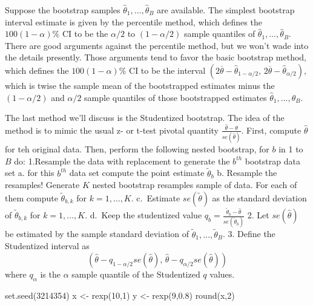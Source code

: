 \documentclass[
]{book}
\newenvironment{Shaded}{\begin{snugshade}}{\end{snugshade}}
\newcommand{\DecValTok}[1]{\textcolor[rgb]{0.00,0.00,0.81}{#1}}
\newcommand{\FloatTok}[1]{\textcolor[rgb]{0.00,0.00,0.81}{#1}}
\newcommand{\FunctionTok}[1]{\textcolor[rgb]{0.00,0.00,0.00}{#1}}
\newcommand{\NormalTok}[1]{#1}
\newcommand{\OtherTok}[1]{\textcolor[rgb]{0.56,0.35,0.01}{#1}}
\begin{document}
Suppose the bootstrap samples \(\hat\theta_1, \ldots, \hat\theta_B\) are available. The simplest bootstrap interval estimate is given by the percentile method, which defines the \(100(1-\alpha)\%\) CI to be the \(\alpha/2\) to \((1-\alpha/2)\) sample quantiles of \(\hat\theta_1, \ldots, \hat\theta_B\). There are good arguments against the percentile method, but we won't wade into the details presently. Those arguments tend to favor the basic bootstrap method, which defines the \(100(1-\alpha)\%\) CI to be the interval \((2\overline \theta - \hat\theta_{1-\alpha/2}, \, 2\overline \theta - \hat\theta_{\alpha/2})\), which is twise the sample mean of the bootstrapped estimates minus the \((1-\alpha/2)\) and \(\alpha/2\) sample quantiles of those bootstrapped estimates \(\hat\theta_1, \ldots, \hat\theta_B\).

The last method we'll discuss is the Studentized bootstrap. The idea of the method is to mimic the usual z- or t-test pivotal quantity \(\frac{\hat\theta - \theta}{se(\hat\theta)}\). First, compute \(\hat\theta\) for teh original data. Then, perform the following nested bootstrap, for \(b\) in 1 to \(B\) do:
1.Resample the data with replacement to generate the \(b^{th}\) bootstrap data set
a. for this \(b^{th}\) data set compute the point estimate \(\tilde \theta_b\)
b. Resample the resamples! Generate \(K\) nested bootstrap resamples sample of data. For each of them compute \(\tilde\theta_{b,k}\) for \(k=1, \ldots, K\).
c.~Estimate \(se(\tilde \theta)\) as the standard deviation of \(\tilde\theta_{b,k}\) for \(k=1, \ldots, K\).
d.~Keep the studentized value \(q_b = \frac{\tilde\theta_b - \hat\theta}{se(\tilde\theta_b)}\)
2. Let \(se(\hat\theta)\) be estimated by the sample standard deviation of \(\tilde\theta_1, \ldots, \tilde\theta_B\).
3. Define the Studentized interval as
\[(\hat\theta - q_{1-\alpha/2}se(\hat\theta), \, \hat\theta - q_{\alpha/2}se(\hat\theta))\]
where \(q_\alpha\) is the \(\alpha\) sample quantile of the Studentized \(q\) values.

\begin{Shaded}
\begin{Highlighting}[]
\FunctionTok{set.seed}\NormalTok{(}\DecValTok{3214354}\NormalTok{)}
\NormalTok{x }\OtherTok{\textless{}{-}} \FunctionTok{rexp}\NormalTok{(}\DecValTok{10}\NormalTok{,}\DecValTok{1}\NormalTok{)}
\NormalTok{y }\OtherTok{\textless{}{-}} \FunctionTok{rexp}\NormalTok{(}\DecValTok{9}\NormalTok{,}\FloatTok{0.8}\NormalTok{)}
\FunctionTok{round}\NormalTok{(x,}\DecValTok{2}\NormalTok{)}
\end{Highlighting}
\end{Shaded}
\end{document}
